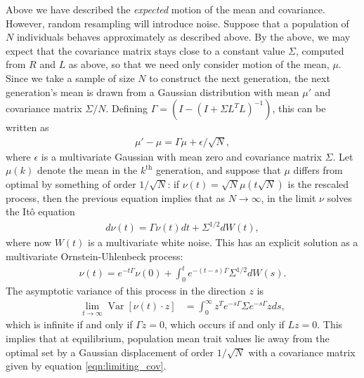 \documentclass{article}
\newcommand{\var}{\mathop{\mbox{Var}}}
\newcommand{\1}{\mathbbm{1}}
\begin{document}
Above we have described the \emph{expected} motion of the mean and covariance.
However, random resampling will introduce noise.
Suppose that a population of $N$ individuals
behaves approximately as described above.
By the above,
we may expect that the covariance matrix stays close to a constant value $\Sigma$,
computed from $R$ and $L$ as above,
so that we need only consider motion of the mean, $\mu$.
Since we take a sample of size $N$ to construct the next generation,
the next generation's mean is drawn from a Gaussian distribution with mean $\mu'$
and covariance matrix $\Sigma/N$.
Defining $\Gamma = (I - (I + \Sigma L^T L)^{-1})$,
this can be written as
\begin{align*}
    \mu' - \mu = \Gamma \mu + \epsilon/\sqrt{N} ,
\end{align*}
where $\epsilon$ is a multivariate Gaussian with mean zero and covariance matrix $\Sigma$.
Let $\mu(k)$ denote the mean in the $k^\text{th}$ generation,
and suppose that $\mu$ differs from optimal by something of order $1/\sqrt{N}$:
if $\nu(t) = \sqrt{N} \mu(t\sqrt{N})$ is the rescaled process,
then the previous equation implies that as $N \to \infty$, 
in the limit $\nu$ solves the It\^{o} equation
\begin{align*}
    d \nu(t) = \Gamma \nu(t) dt + \Sigma^{1/2} dW(t) ,
\end{align*}
where now $W(t)$ is a multivariate white noise.
This has an explicit solution as a multivariate Ornstein-Uhlenbeck process:
\begin{align*}
    \nu(t) = e^{-t \Gamma} \nu(0) + \int_0^t e^{-(t-s) \Gamma} \Sigma^{1/2} dW(s).
\end{align*}
The asymptotic variance of this process in the direction $z$ is
\begin{align} \label{eqn:limiting_cov}
    \lim_{t \to \infty} \var[\nu(t) \cdot z]
    &=
    \int_0^\infty z^T e^{-s \Gamma} \Sigma e^{-s \Gamma} z ds ,
\end{align}
which is infinite if and only if $\Gamma z = 0$,
which occurs if and only if $Lz=0$.
This implies that at equilibrium, 
population mean trait values lie away from the optimal set
by a Gaussian displacement of order $1/\sqrt{N}$
with a covariance matrix given by equation \eqref{eqn:limiting_cov}.
\end{document}
